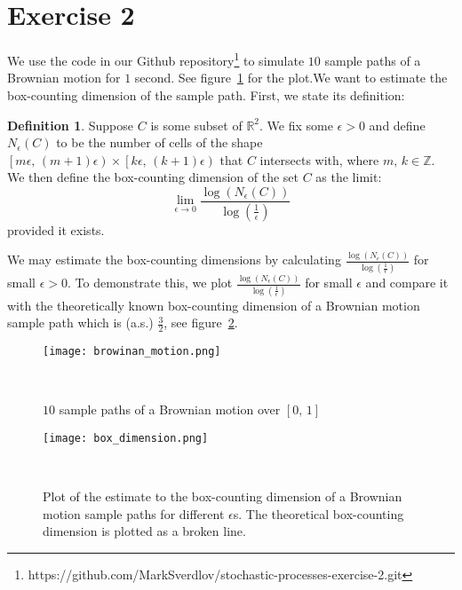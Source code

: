 \documentclass{amsart}
\theoremstyle{plain}
\theoremstyle{definition}
\newtheorem{definition}[section]{Definition}
\theoremstyle{definition}
\theoremstyle{remark}
\begin{document}
\section{Exercise 2}
We use the code in our Github repository\footnote{https://github.com/MarkSverdlov/stochastic-processes-exercise-2.git} to simulate \(10\) sample paths of a Brownian motion for \(1\) second. See figure~\ref{fig:brownian-motion} for the plot.We want to estimate the box-counting dimension of the sample path. First, we state its definition:
\begin{definition}
    Suppose \(C\) is some subset of \(\mathbb{R}^{2}\). We fix some \(\epsilon>0\) and define \(N_{\epsilon}\left(C\right)\) to be the number of cells of the shape \(\left[m \epsilon,\,\left(m+1\right) \epsilon\right) \times \left[k \epsilon,\,\left(k+1\right) \epsilon\right)\) that \(C\) intersects with, where \(m,\,k \in \mathbb{Z}\). We then define the box-counting dimension of the set \(C\) as the limit:
    \begin{equation*}
        \lim_{\epsilon\rightarrow 0} \frac{\log \left(N_{\epsilon}\left(C\right)\right)}{\log \left(\frac{1}{\epsilon}\right)}
    \end{equation*}
    provided it exists.
\end{definition}

We may estimate the box-counting dimensions by calculating \(\frac{\log \left(N_{\epsilon}\left(C\right)\right)}{\log \left(\frac{1}{\epsilon}\right)}
\) for small \(\epsilon >0\). To demonstrate this, we plot \(\frac{\log \left(N_{\epsilon}\left(C\right)\right)}{\log \left(\frac{1}{\epsilon}\right)}
\) for small \(\epsilon\) and compare it with the theoretically known box-counting dimension of a Brownian motion sample path which is (a.s.) \(\frac{3}{2}\), see figure~\ref{fig:box-dim}.

\begin{figure}
    \texttt{[image: browinan\_motion.png]}
    \caption{\(10\) sample paths of a Brownian motion over \(\left[0,\,1\right]\)}~\label{fig:brownian-motion}
\end{figure}

\begin{figure}
    \texttt{[image: box\_dimension.png]}
    \caption{Plot of the estimate to the box-counting dimension of a Brownian motion sample paths for different \(\epsilon\)s. The theoretical box-counting dimension is plotted as a broken line.}~\label{fig:box-dim}
\end{figure}
\end{document}
